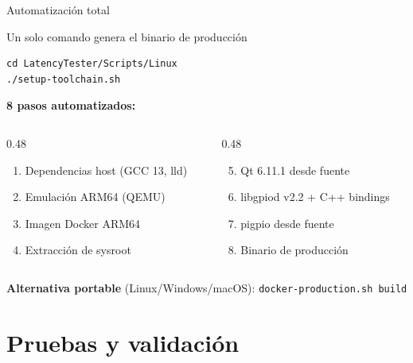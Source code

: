 \documentclass[aspectratio=169,11pt]{beamer}
\begin{document}
\begin{frame}[fragile]{Automatización total}

\begin{block}{Un solo comando genera el binario de producción}
\begin{lstlisting}
cd LatencyTester/Scripts/Linux
./setup-toolchain.sh
\end{lstlisting}
\end{block}

\vspace{0.2cm}

\textbf{8 pasos automatizados:}
\begin{columns}[T]
\begin{column}{0.48\textwidth}
\begin{enumerate}
    \item Dependencias host (GCC 13, lld)
    \item Emulación ARM64 (QEMU)
    \item Imagen Docker ARM64
    \item Extracción de sysroot
\end{enumerate}
\end{column}
\begin{column}{0.48\textwidth}
\begin{enumerate}
    \setcounter{enumi}{4}
    \item Qt 6.11.1 desde fuente
    \item libgpiod v2.2 + C++ bindings
    \item pigpio desde fuente
    \item Binario de producción
\end{enumerate}
\end{column}
\end{columns}

\vspace{0.2cm}
\textbf{Alternativa portable} (Linux/Windows/macOS): \texttt{docker-production.sh build}

\end{frame}

\section{Pruebas y validación}
\end{document}
